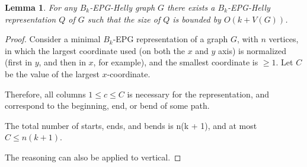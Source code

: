 \documentclass[a4paper,11pt]{article}
\newtheorem{lema}[theorem]{Lemma}
\begin{document}


\begin{lema}
For any $B_k$-EPG-Helly graph $G$ there exists  a $B_k$-EPG-Helly representation $Q$ of $G$ such that the size of $Q$ is bounded by $O(k+V(G))$.

\end{lema}

\begin{proof}
Consider a minimal $B_k$-EPG representation of a graph $G$, with $n$ vertices, in which the largest coordinate used (on both the $x$ and $y$ axis) is normalized (first in $y$, and then in $x$, for example), and the smallest coordinate is $\geq 1$. Let $C$ be the value of the largest $x$-coordinate.

 Therefore, all columns $1 \leq c \leq C$ is necessary for the representation, and correspond to the beginning, end, or bend of some path.

The total number of starts, ends, and bends is n(k + 1), and at most $C \leq n(k + 1)$.

The reasoning can also be applied to vertical.
\end{proof}
\end{document}
